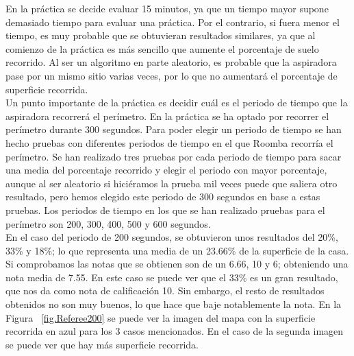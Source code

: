 En la práctica se decide evaluar 15 minutos, ya que un tiempo mayor supone demasiado tiempo para evaluar una práctica. Por el contrario, si fuera menor el tiempo, es muy probable que se obtuvieran resultados similares, ya que al comienzo de la práctica es más sencillo que aumente el porcentaje de suelo recorrido. Al ser un algoritmo en parte aleatorio, es probable que la aspiradora pase por un mismo sitio varias veces, por lo que no aumentará el porcentaje de superficie recorrida.\\

Un punto importante de la práctica es decidir cuál es el periodo de tiempo que la aspiradora recorrerá el perímetro. En la práctica se ha optado por recorrer el perímetro durante 300 segundos. Para poder elegir un periodo de tiempo se han hecho pruebas con diferentes periodos de tiempo en el que Roomba recorría el perímetro. Se han realizado tres pruebas por cada periodo de tiempo para sacar una media del porcentaje recorrido y elegir el periodo con mayor porcentaje, aunque al ser aleatorio si hiciéramos la prueba mil veces puede que saliera otro resultado, pero hemos elegido este periodo de 300 segundos en base a estas pruebas. Los periodos de tiempo en los que se han realizado pruebas para el perímetro son 200, 300, 400, 500 y 600 segundos.\\

En el caso del periodo de 200 segundos, se obtuvieron unos resultados del 20\%, 33\% y 18\%; lo que representa una media de un 23.66\% de la superficie de la casa. Si comprobamos las notas que se obtienen son de un 6.66, 10 y 6; obteniendo una nota media de 7.55. En este caso se puede ver que el 33\% es un gran resultado, que nos da como nota de calificación 10. Sin embargo, el resto de resultados obtenidos no son muy buenos, lo que hace que baje notablemente la nota. En la Figura ~\ref{fig.Referee200} se puede ver la imagen del mapa con la superficie recorrida en azul para los 3 casos mencionados. En el caso de la segunda imagen se puede ver que hay más superficie recorrida.


